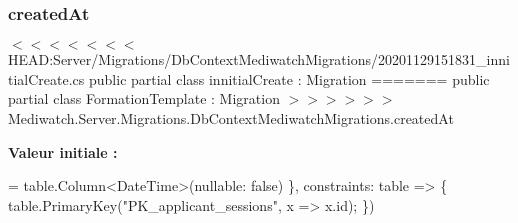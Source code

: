 \subsubsection{\texorpdfstring{created\+At}{createdAt}}
{\footnotesize\ttfamily $<$$<$$<$$<$$<$$<$$<$ H\+E\+A\+D\+:\+Server/Migrations/Db\+Context\+Mediwatch\+Migrations/20201129151831\+\_\+innitial\+Create.\+cs public partial class innitial\+Create \+: Migration ======= public partial class Formation\+Template \+: Migration $>$$>$$>$$>$$>$$>$ Mediwatch.\+Server.\+Migrations.\+Db\+Context\+Mediwatch\+Migrations.\+created\+At}

{\bfseries Valeur initiale \+:}
\begin{DoxyCode}
= table.Column<DateTime>(nullable: \textcolor{keyword}{false})
                \},
                constraints: table =>
                \{
                    table.PrimaryKey(\textcolor{stringliteral}{"PK\_applicant\_sessions"}, x => x.id);
                \})
\end{DoxyCode}
